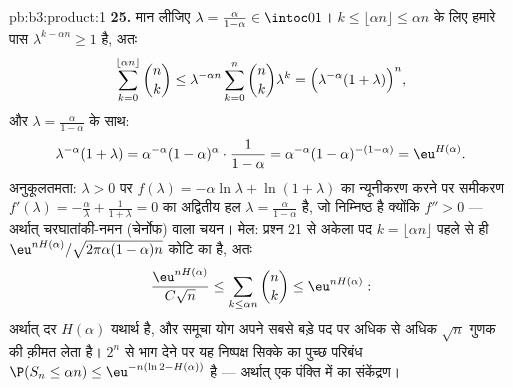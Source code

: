 \begin{solution}{pb:b3:product:1}
\textbf{25.} मान लीजिए $\lambda = \frac{\alpha}{1-\alpha} \in
\intoc01$। $k \leq \lfloor\alpha n\rfloor \leq \alpha n$ के लिए हमारे पास $\lambda^{k - \alpha n} \geq 1$ है, अतः
\[
\sum_{k=0}^{\lfloor\alpha n\rfloor}\binom nk
\leq \lambda^{-\alpha n}\sum_{k=0}^{n}\binom nk\lambda^{k}
= \Bigl(\lambda^{-\alpha}(1 + \lambda)\Bigr)^{n},
\]
और $\lambda = \frac\alpha{1-\alpha}$ के साथ:
\[
\lambda^{-\alpha}(1+\lambda)
= \alpha^{-\alpha}(1-\alpha)^{\alpha}\cdot\frac1{1-\alpha}
= \alpha^{-\alpha}(1-\alpha)^{-(1-\alpha)}
= \eu^{H(\alpha)} .
\]
अनुकूलतमता: $\lambda > 0$ पर $f(\lambda) = -\alpha\ln\lambda +
\ln(1+\lambda)$ का न्यूनीकरण करने पर समीकरण $f'(\lambda)
= -\frac\alpha\lambda + \frac1{1+\lambda} = 0$ का
अद्वितीय हल $\lambda = \frac\alpha{1-\alpha}$ है, जो निम्निष्ठ है क्योंकि $f'' > 0$ --- अर्थात्
चरघातांकी-नमन (चेर्नोफ) वाला चयन। मेल: प्रश्न 21 से अकेला पद $k =
\lfloor\alpha n\rfloor$
पहले से ही $\eu^{nH(\alpha)}/\sqrt{2\pi\alpha(1-\alpha)n}$ कोटि का है, अतः
\[
\frac{\eu^{nH(\alpha)}}{C\sqrt n} \leq
\sum_{k\leq\alpha n}\binom nk \leq \eu^{nH(\alpha)} :
\]
अर्थात् दर $H(\alpha)$ यथार्थ है, और समूचा योग अपने सबसे बड़े पद पर अधिक
से अधिक $\sqrt n$ गुणक की क़ीमत लेता है। $2^n$ से भाग देने पर यह निष्पक्ष
सिक्के का पुच्छ परिबंध $\P(S_n \leq \alpha n) \leq
\eu^{-n(\ln2 - H(\alpha))}$ है --- अर्थात् एक पंक्ति में  का
संकेंद्रण।
\end{solution}
